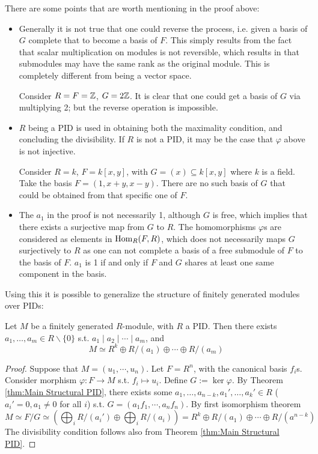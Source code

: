 \begin{remark}
    There are some points that are worth mentioning in the proof above:
    \begin{itemize}
        \item Generally it is not true that one could reverse the process, i.e. given a basis of $G$ complete that to become a basis of $F$. This simply results from the fact that scalar multiplication on modules is not reversible, which results in that submodules may have the same rank as the original module. This is completely different from being a vector space.
        
        Consider $R = F = \mathbb{Z}$, $G = 2\mathbb{Z}$. It is clear that one could get a basis of $G$ via multiplying 2; but the reverse operation is impossible.
        \item $R$ being a PID is used in obtaining both the maximality condition, and concluding the divisibility. If $R$ is not a PID, it may be the case that $\varphi$ above is not injective. 
        
        Consider $R = k$, $F = k[x, y]$, with $G = (x) \subseteq k[x, y]$ where $k$ is a field. Take the basis $F = (1, x + y, x - y)$. There are no such basis of $G$ that could be obtained from that specific one of $F$.
        \item The $a_1$ in the proof is not necessarily 1, although $G$ is free, which implies that there exists a surjective map from $G$ to $R$. The homomorphisms $\varphi$s are considered as elements in $\mathrm{Hom}_R(F, R)$, which does not necessarily maps $G$ surjectively to $R$ as one can not complete a basis of a free submodule of $F$ to the basis of $F$. $a_1$ is 1 if and only if $F$ and $G$ shares at least one same component in the basis. 
    \end{itemize}
\end{remark}

Using this it is possible to generalize the structure of finitely generated modules over PIDs:

\begin{theorem}[Sturcture, v1]\label{thm:Structure f.g. modules over PID v1}
    Let $M$ be a finitely generated $R$-module, with $R$ a PID. Then there exists $a_1, \ldots, a_m \in R\smallsetminus\{0\}$ s.t. $a_1 \mid a_2 \mid \cdots \mid a_m$, and 
    \[
        M \simeq R^k \oplus R/(a_1) \oplus \cdots \oplus R/(a_m)
    \] 
\end{theorem}

\begin{proof}
    Suppose that $M = (u_1, \cdots, u_n)$. Let $F = R^n$, with the canonical basis $f_i$s. Consider morphism $\varphi: F \to M$ s.t. $f_i \mapsto u_i$. Define $G := \ker \varphi$. By Theorem \ref{thm:Main Structural PID}, there exists some $a_1, \ldots, a_{n-k}, a_1', \ldots, a_k' \in R$ ($a_i' = 0, a_1 \neq 0$ for all $i$) s.t. $G = (a_1f_1, \cdots, a_n f_n)$. By first isomorphism theorem 
    \[
        M \simeq F / G \simeq \left(\bigoplus_i R/(a_i') \oplus \bigoplus_i R/(a_i)\right) = R^k \oplus R/(a_1) \oplus \cdots \oplus R/(a^{n-k})
    \]
    The divisibility condition follows also from Theorem \ref{thm:Main Structural PID}.
\end{proof}

